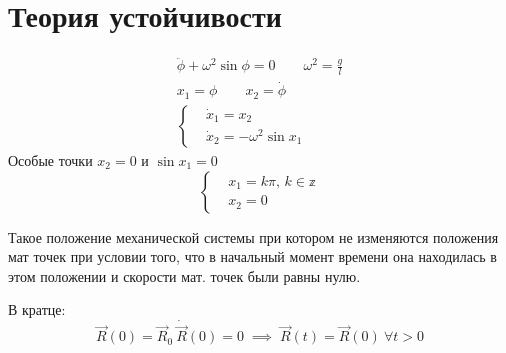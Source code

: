\documentclass{article}
\begin{document}
\section{Теория устойчивости}

\begin{gather*}
  \ddot{\phi}+\omega^{2}\sin \phi = 0 \qquad \omega^{2}=\frac{g}{l} \\ 
  x_1 = \phi \qquad x_2 = \dot{\phi} \\ 
  \left\{\begin{aligned}
    & \dot{x}_1=x_2 \\ 
    & \dot{x}_2 = -\omega^{2}\sin x_1
  \end{aligned}\right.
\end{gather*}
Особые точки $x_2=0$ и $\sin x_1=0$
\[
  \left\{\begin{aligned}
    & x_1=k\pi, \, k \in \mathbb{z} \\ 
    & x_2 = 0
  \end{aligned}\right.
\]

\begin{definition}
  Такое положение механической системы при котором не изменяются
  положения мат точек при условии того,
  что в начальный момент времени она находилась в этом положении
  и скорости мат. точек были равны нулю.
\end{definition}
\begin{remark}
  В кратце:
  \[
    \vec{R}(0)=\vec{R}_0 \ \dot{\vec{R}}(0)=0 \; \implies \; \vec{R}(t)=\vec{R}(0) \ \forall t>0
  \]
\end{remark}
\end{document}
